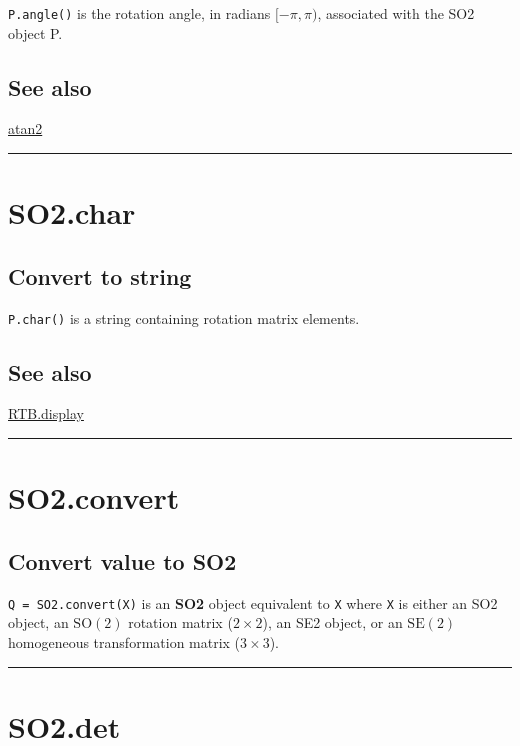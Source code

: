\texttt{P.angle()} is the rotation angle, in radians $[-\pi, \pi)$, associated with the
SO2 object P.


\subsection*{See also}


\hyperlink{atan2}{\color{blue} atan2}

\vspace{1.5ex}\hrule

\hypertarget{SO2.char}{\section*{SO2.char}}
\subsection*{Convert to string}


\texttt{P.char()} is a string containing rotation matrix elements.


\subsection*{See also}


\hyperlink{RTB.display}{\color{blue} RTB.display}

\vspace{1.5ex}\hrule

\hypertarget{SO2.convert}{\section*{SO2.convert}}
\subsection*{Convert value to SO2}


\texttt{Q = SO2.convert(X)} is an \textbf{\color{red} SO2} object equivalent to \texttt{X} where \texttt{X} is either
an SO2 object, an $\mbox{SO}(2)$ rotation matrix ($2 \times 2$), an SE2 object, or an
$\mbox{SE}(2)$ homogeneous transformation matrix ($3 \times 3$).

\vspace{1.5ex}\hrule

\hypertarget{SO2.det}{\section*{SO2.det}}
